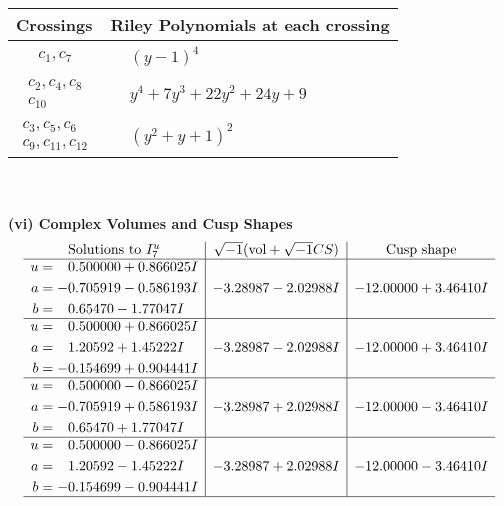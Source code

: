 \documentclass[1p]{elsarticle_modified}
\theoremstyle{definition}
\newcommand{\I}{\sqrt{-1}}
\begin{document}
\begin{tabular}{m{50pt}|m{274pt}}
Crossings & \hspace{64pt}Riley Polynomials at each crossing \\
\hline $$\begin{aligned}c_{1},c_{7}\end{aligned}$$&$\begin{aligned}
&(y-1)^4
\end{aligned}$\\
\hline $$\begin{aligned}c_{2},c_{4},c_{8}\\c_{10}\end{aligned}$$&$\begin{aligned}
&y^4+7 y^3+22 y^2+24 y+9
\end{aligned}$\\
\hline $$\begin{aligned}c_{3},c_{5},c_{6}\\c_{9},c_{11},c_{12}\end{aligned}$$&$\begin{aligned}
&(y^2+y+1)^2
\end{aligned}$\\
\hline
\end{tabular}\\~\\
\newpage\flushleft \textbf{(vi) Complex Volumes and Cusp Shapes}
$$\begin{array}{c|c|c}  
\text{Solutions to }I^u_{7}& \I (\text{vol} + \sqrt{-1}CS) & \text{Cusp shape}\\
 \hline 
\begin{aligned}
u &= \phantom{-}0.500000 + 0.866025 I \\
a &= -0.705919 - 0.586193 I \\
b &= \phantom{-}0.65470 - 1.77047 I\end{aligned}
 & -3.28987 - 2.02988 I & -12.00000 + 3.46410 I \\ \hline\begin{aligned}
u &= \phantom{-}0.500000 + 0.866025 I \\
a &= \phantom{-}1.20592 + 1.45222 I \\
b &= -0.154699 + 0.904441 I\end{aligned}
 & -3.28987 - 2.02988 I & -12.00000 + 3.46410 I \\ \hline\begin{aligned}
u &= \phantom{-}0.500000 - 0.866025 I \\
a &= -0.705919 + 0.586193 I \\
b &= \phantom{-}0.65470 + 1.77047 I\end{aligned}
 & -3.28987 + 2.02988 I & -12.00000 - 3.46410 I \\ \hline\begin{aligned}
u &= \phantom{-}0.500000 - 0.866025 I \\
a &= \phantom{-}1.20592 - 1.45222 I \\
b &= -0.154699 - 0.904441 I\end{aligned}
 & -3.28987 + 2.02988 I & -12.00000 - 3.46410 I\\
 \hline 
 \end{array}$$\newpage\newpage\renewcommand{\arraystretch}{1}
\end{document}
